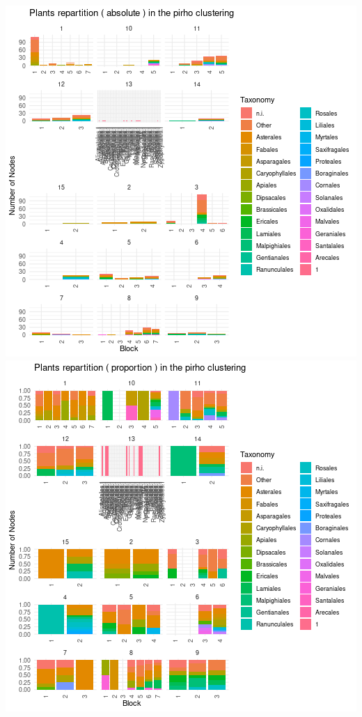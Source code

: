 \includegraphics{figure/pirho_plot_taxonomy_plants-1.png}\includegraphics{figure/pirho_plot_taxonomy_plants-2.png}

